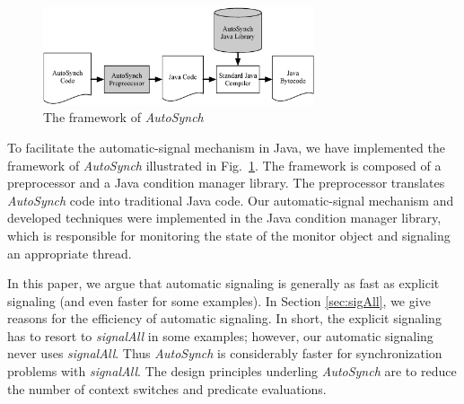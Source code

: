 \documentclass[preprint]{sigplanconf}
\begin{document}
\begin{figure}[ht!]
  \centering
  \includegraphics[width=80mm]{fig/flow.eps}
  \caption{The framework of {\em  AutoSynch}}
  \label{fig:fw}
\end{figure}


To facilitate the automatic-signal mechanism in Java, we have implemented the 
framework of {\em AutoSynch} illustrated in Fig.~\ref{fig:fw}. 
The framework is composed of a 
preprocessor and a Java condition manager library. The preprocessor translates 
{\em AutoSynch} code into traditional Java code. 
Our automatic-signal mechanism and 
developed techniques were implemented in the Java condition manager library, 
which is responsible for monitoring the state of the monitor object
and signaling an appropriate thread.


%


In this paper, we argue that automatic signaling is generally as fast as explicit 
signaling (and even faster for some examples). In Section \ref{sec:sigAll}, we give reasons
for the efficiency of automatic signaling. In short, the explicit signaling has 
to resort to {\em signalAll} in some examples; however, our automatic signaling never 
uses {\em signalAll}. Thus {\em AutoSynch} is 
considerably faster for synchronization problems with 
{\em signalAll}. The design principles underling {\em AutoSynch} are to reduce 
the number of context switches and predicate evaluations.
\end{document}
